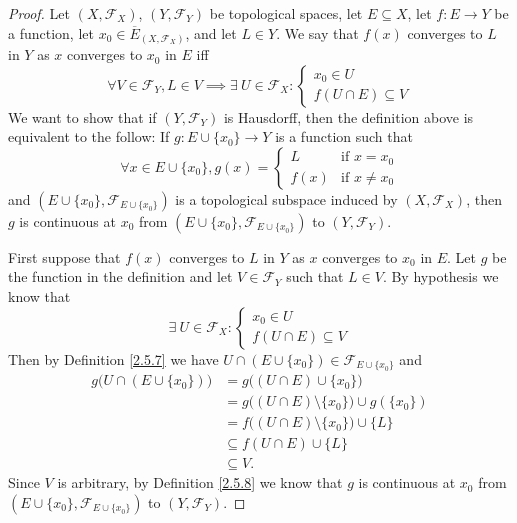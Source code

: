 \begin{proof}
    Let \((X, \mathcal{F}_X)\), \((Y, \mathcal{F}_Y)\) be topological spaces, let \(E \subseteq X\), let \(f : E \to Y\) be a function, let \(x_0 \in \overline{E}_{(X, \mathcal{F}_X)}\), and let \(L \in Y\).
    We say that \(f(x)\) converges to \(L\) in \(Y\) as \(x\) converges to \(x_0\) in \(E\) iff
    \[
        \forall V \in \mathcal{F}_Y, L \in V \implies \exists\ U \in \mathcal{F}_X : \begin{cases}
            x_0 \in U \\
            f(U \cap E) \subseteq V
        \end{cases}
    \]
    We want to show that if \((Y, \mathcal{F}_Y)\) is Hausdorff, then the definition above is equivalent to the follow:
    If \(g : E \cup \{x_0\} \to Y\) is a function such that
    \[
        \forall x \in E \cup \{x_0\}, g(x) = \begin{cases}
            L    & \text{if } x = x_0    \\
            f(x) & \text{if } x \neq x_0
        \end{cases}
    \]
    and \((E \cup \{x_0\}, \mathcal{F}_{E \cup \{x_0\}})\) is a topological subspace induced by \((X, \mathcal{F}_X)\), then \(g\) is continuous at \(x_0\) from \((E \cup \{x_0\}, \mathcal{F}_{E \cup \{x_0\}})\) to \((Y, \mathcal{F}_Y)\).

    First suppose that \(f(x)\) converges to \(L\) in \(Y\) as \(x\) converges to \(x_0\) in \(E\).
    Let \(g\) be the function in the definition and let \(V \in \mathcal{F}_Y\) such that \(L \in V\).
    By hypothesis we know that
    \[
        \exists\ U \in \mathcal{F}_X : \begin{cases}
            x_0 \in U \\
            f(U \cap E) \subseteq V
        \end{cases}
    \]
    Then by Definition \ref{2.5.7} we have \(U \cap (E \cup \{x_0\}) \in \mathcal{F}_{E \cup \{x_0\}}\) and
    \begin{align*}
        g\big(U \cap (E \cup \{x_0\})\big) & = g\big((U \cap E) \cup \{x_0\}\big)                      \\
                                           & = g\big((U \cap E) \setminus \{x_0\}\big) \cup g(\{x_0\}) \\
                                           & = f\big((U \cap E) \setminus \{x_0\}\big) \cup \{L\}      \\
                                           & \subseteq f(U \cap E) \cup \{L\}                          \\
                                           & \subseteq V.
    \end{align*}
    Since \(V\) is arbitrary, by Definition \ref{2.5.8} we know that \(g\) is continuous at \(x_0\) from \((E \cup \{x_0\}, \mathcal{F}_{E \cup \{x_0\}})\) to \((Y, \mathcal{F}_Y)\).


\end{proof}
